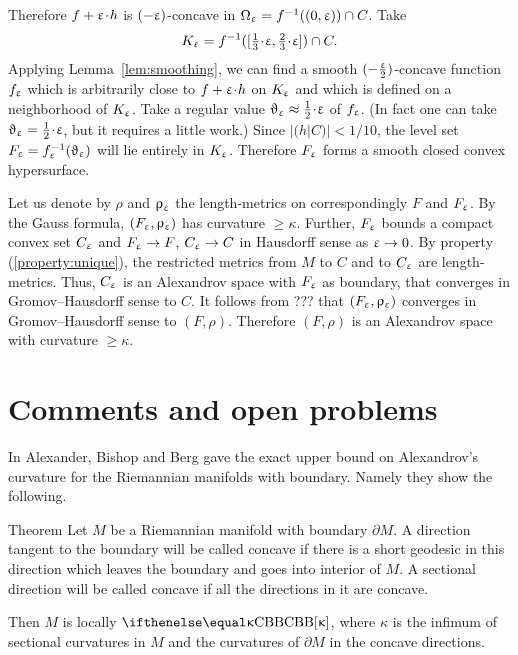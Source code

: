 Therefore $f+\eps\cdot h$ is $(-\upvarepsilon)$-concave in 
$\Omega_\eps=f^{-1}((0,\eps))\cap C$.
Take 
\[K_\eps\z=f^{-1}([\tfrac{1}{3}\cdot\eps,\tfrac{2}{3}\cdot\eps])\cap C.\]
Applying Lemma~\ref{lem:smoothing}, we can find a smooth $(-\tfrac{\upvarepsilon}2)$-concave function $f_{\upvarepsilon}$ which is arbitrarily close to $f+\eps\cdot h$ on $K_\upvarepsilon$ and which is defined on a neighborhood of $K_\upvarepsilon$. 
Take a regular value $\theta_\eps\approx\tfrac{1}{2}\cdot\eps$ of $f_\upvarepsilon$. (In fact one can take $\theta_\eps=\tfrac{1}{2}\cdot\eps$, but it requires a little work.) 
Since $|(h|C)|<1/10$, the level set $F_\upvarepsilon=f_{\upvarepsilon}^{-1}(\upvartheta_\upvarepsilon)$ will lie entirely in $K_\upvarepsilon$.
Therefore $F_\upvarepsilon$ forms a smooth closed convex hypersurface.

Let us denote by $\rho$ and $\upvarrho_\upvarepsilon$ the length-metrics on  correspondingly $F$ and $F_\upvarepsilon$.
By the Gauss formula, $(F_\upvarepsilon,\upvarrho_\upvarepsilon)$ has curvature $\ge\kappa$.
Further, $F_\upvarepsilon$ bounds a compact convex set $C_\upvarepsilon$ 
and $F_\eps\to F$, $C_\eps\to C$ in Hausdorff sense as $\eps\to 0$. 
By property (\ref{property:unique}), the restricted metrics from $M$ to $C$ and to $C_\upvarepsilon$ are length-metrics.
Thus, $C_\upvarepsilon$ is an Alexandrov space with $F_\upvarepsilon$ as boundary, that converges in Gromov--Hausdorff sense to $C$.  It follows from ???  that $(F_\upvarepsilon,\upvarrho_\upvarepsilon)$  converges in Gromov--Hausdorff sense to $(F,\rho)$.
Therefore $(F,\rho)$ is an Alexandrov space with curvature $\ge \kappa$.\qeds

\section{Comments and open problems}

In \cite{a-b-b:CBA-m-w-b} Alexander, Bishop and Berg gave the exact upper bound on Alexandrov's curvature for the Riemannian manifolds with boundary.
Namely they show the following.

\begin{thm}{Theorem}
Let $M$ be a Riemannian manifold with boundary $\partial M$.
A direction tangent to the boundary will be called concave if there is a short geodesic in this direction which leaves the boundary and goes into interior of $M$.
A sectional direction will be called concave if all the directions in it are concave.

Then $M$ is locally $\Alex\kappa$, where $\kappa$ is the infimum of sectional curvatures in $M$ and  the curvatures of $\partial M$ in the concave directions.
\end{thm}


